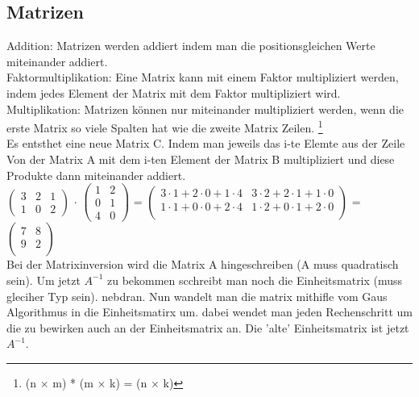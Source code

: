 \documentclass[a4paper,10pt]{scrartcl}
\begin{document}
        \subsection{Matrizen}
            Addition: Matrizen werden addiert indem man die positionsgleichen Werte miteinander addiert. \\
            Faktormultiplikation: Eine Matrix kann mit einem Faktor multipliziert werden, indem jedes Element der Matrix mit dem Faktor multipliziert wird. \\
            Multiplikation: Matrizen können nur miteinander multipliziert werden, wenn die erste Matrix so viele Spalten hat wie die zweite Matrix Zeilen. \footnote{(n $\times$ m) * (m $\times$ k) = (n $\times$ k)} \\
            Es entsthet eine neue Matrix C. Indem man jeweils das i-te Elemte aus der Zeile Von der Matrix A mit dem i-ten Element der Matrix B multipliziert und diese Produkte dann miteinander addiert. \\
            $\begin{pmatrix}
                3 & 2 & 1 \\
                1 & 0 & 2
            \end{pmatrix}$
            $\cdot$
            $\begin{pmatrix}
                1 & 2 \\
                0 & 1 \\
                4 & 0
            \end{pmatrix}$
            = 
            $\begin{pmatrix}
                3 \cdot 1 + 2 \cdot 0 + 1 \cdot 4 & 3 \cdot 2 + 2 \cdot 1 + 1 \cdot 0  \\
                1 \cdot 1 + 0 \cdot 0 + 2 \cdot 4 & 1 \cdot 2 + 0 \cdot 1 + 2 \cdot 0 \\
                
            \end{pmatrix}$
            = $\begin{pmatrix}
                7 & 8 \\
                9 & 2 \\
            \end{pmatrix}$ \\
            Bei der Matrixinversion wird die Matrix A hingeschreiben (A muss quadratisch sein). Um jetzt $A^{-1}$ zu bekommen scchreibt man noch die Einheitsmatrix (muss gleciher Typ sein).
            nebdran. Nun wandelt man die matrix mithifle vom Gaus Algorithmus in die Einheitsmatirx um. dabei wendet man jeden Rechenschritt um die zu bewirken auch an der Einheitsmatrix an. 
            Die 'alte' Einheitsmatrix ist jetzt $A^{-1}$.
\end{document}
